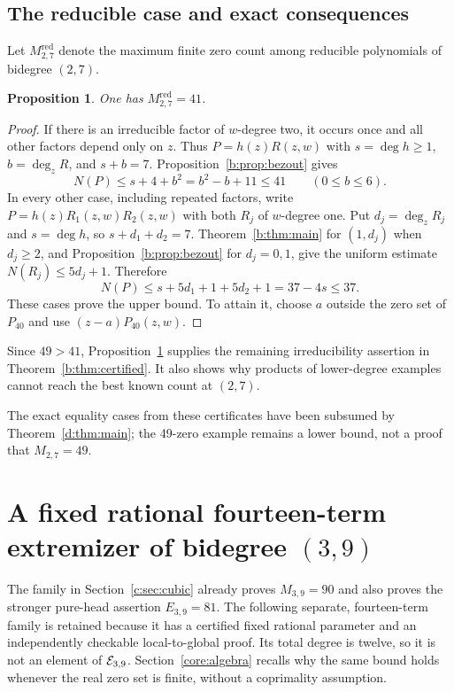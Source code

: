 \documentclass[UTF8,11pt]{ctexart}
\newtheorem{prop}[thm]{Proposition}
\theoremstyle{definition}
\numberwithin{equation}{section}
\begin{document}
\subsection{The reducible case and exact consequences}
Let $M^{\mathrm{red}}_{2,7}$ denote the maximum finite zero count
among reducible polynomials of bidegree $(2,7)$.
\begin{prop}\label{b:prop:reducible}
One has $M^{\mathrm{red}}_{2,7}=41$.
\end{prop}
\begin{proof}
If there is an irreducible factor of $w$-degree two, it occurs once
and all other factors depend only on $z$. Thus
$P=h(z)R(z,w)$ with $s=\deg h\ge1$, $b=\deg_zR$, and $s+b=7$.
Proposition~\ref{b:prop:bezout} gives
\[
 N(P)\le s+4+b^2=b^2-b+11\le41\qquad(0\le b\le6).
\]
In every other case, including repeated factors, write
$P=h(z)R_1(z,w)R_2(z,w)$ with both $R_j$ of $w$-degree one.
Put $d_j=\deg_zR_j$ and $s=\deg h$, so $s+d_1+d_2=7$.
Theorem~\ref{b:thm:main} for $(1,d_j)$ when $d_j\ge2$, and
Proposition~\ref{b:prop:bezout} for $d_j=0,1$, give the uniform
estimate $N(R_j)\le5d_j+1$. Therefore
\[
 N(P)\le s+5d_1+1+5d_2+1=37-4s\le37.
\]
These cases prove the upper bound. To attain it, choose $a$ outside
the zero set of $P_{40}$ and use $(z-a)P_{40}(z,w)$.
\end{proof}

Since $49>41$, Proposition~\ref{b:prop:reducible} supplies the remaining
irreducibility assertion in Theorem~\ref{b:thm:certified}. It also
shows why products of lower-degree examples cannot reach the best
known count at $(2,7)$.

The exact equality cases from these certificates have been subsumed by
Theorem~\ref{d:thm:main}; the 49-zero example remains a lower bound,
not a proof that $M_{2,7}=49$.

\section{A fixed rational fourteen-term extremizer of bidegree \texorpdfstring{$(3,9)$}{(3,9)}}\label{t:sec:example}
The family in Section~\ref{c:sec:cubic} already proves $M_{3,9}=90$ and
also proves the stronger pure-head assertion $E_{3,9}=81$. The following
separate, fourteen-term family is retained because it has a certified
fixed rational parameter and an independently checkable local-to-global
proof. Its total degree is twelve, so it is not an element of
$\mathcal E_{3,9}$.
Section~\ref{core:algebra} recalls why the same bound holds whenever
the real zero set is finite, without a coprimality assumption.
\end{document}
